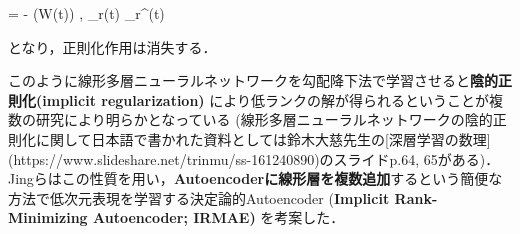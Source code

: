  = - \left\langle \nabla {}(W(t)) , _r(t) _r^\top(t) \right\rangle


となり，正則化作用は消失する．

このように線形多層ニューラルネットワークを勾配降下法で学習させると\textbf{陰的正則化(implicit regularization)} により低ランクの解が得られるということが複数の研究により明らかとなっている (線形多層ニューラルネットワークの陰的正則化に関して日本語で書かれた資料としては鈴木大慈先生の[深層学習の数理](https://www.slideshare.net/trinmu/ss-161240890)のスライドp.64, 65がある)．Jingらはこの性質を用い，\textbf{Autoencoderに線形層を複数追加}するという簡便な方法で低次元表現を学習する決定論的Autoencoder (\textbf{Implicit Rank-Minimizing Autoencoder; IRMAE)} を考案した．
